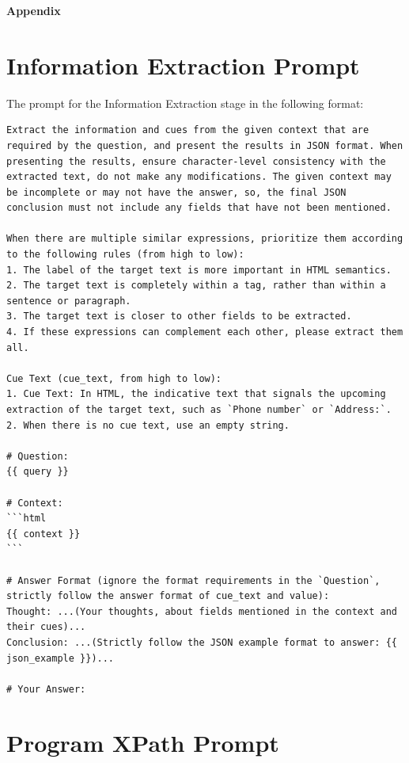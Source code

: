 \documentclass[a4paper]{article}
\begin{document}
\appendix

\centerline{\Large\bfseries Appendix}

\section{Information Extraction Prompt}
\label{sec:ie_prompt}

The prompt for the Information Extraction stage in the following format:

\begin{tcolorbox}
  \begin{lstlisting}[language={}, basicstyle=\ttfamily, columns=fullflexible, breaklines=true]
Extract the information and cues from the given context that are required by the question, and present the results in JSON format. When presenting the results, ensure character-level consistency with the extracted text, do not make any modifications. The given context may be incomplete or may not have the answer, so, the final JSON conclusion must not include any fields that have not been mentioned.

When there are multiple similar expressions, prioritize them according to the following rules (from high to low):
1. The label of the target text is more important in HTML semantics.
2. The target text is completely within a tag, rather than within a sentence or paragraph.
3. The target text is closer to other fields to be extracted.
4. If these expressions can complement each other, please extract them all.

Cue Text (cue_text, from high to low):
1. Cue Text: In HTML, the indicative text that signals the upcoming extraction of the target text, such as `Phone number` or `Address:`.
2. When there is no cue text, use an empty string.

# Question:
{{ query }}

# Context:
```html
{{ context }}
```

# Answer Format (ignore the format requirements in the `Question`, strictly follow the answer format of cue_text and value):
Thought: ...(Your thoughts, about fields mentioned in the context and their cues)...
Conclusion: ...(Strictly follow the JSON example format to answer: {{ json_example }})...

# Your Answer:
\end{lstlisting}
\end{tcolorbox}

\section{Program XPath Prompt}
\label{sec:program_xpath_prompt}
\end{document}
